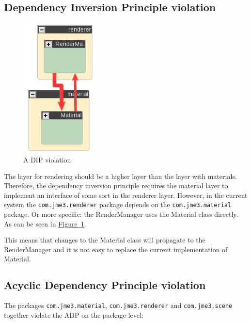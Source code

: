\documentclass[a4paper, 10pt]{article}
\begin{document}
\subsection{Dependency Inversion Principle violation}
\label{sec:dip_violation}
\begin{figure}
\includegraphics[width=40mm]{figures/dip-violation.png}
\vspace{-15pt}
\caption{A DIP violation}
\label{fig:dip-violation}
\vspace{-60pt}
\end{figure}

The layer for rendering should be a higher layer than the
layer with materials.
Therefore, the dependency inversion principle requires
the material layer to implement an interface of some sort
in the renderer layer.
However, in the current system the \verb|com.jme3.renderer| package 
depends on the \verb|com.jme3.material| package.
Or more specific: the RenderManager uses the Material class directly.
As can be seen in 
\hyperref[fig:dip-violation]{Figure~\ref*{fig:dip-violation}}.

This means that changes to the Material class will propagate
to the RenderManager and it is not easy to replace the current
implementation of Material.

\vspace{45pt}


\newpage
\subsection{Acyclic Dependency Principle violation}
\label{sec:adp_violation}

The packages \verb|com.jme3.material|, \verb|com.jme3.renderer| and
\verb|com.jme3.scene| together violate the ADP on the package level:
\end{document}
